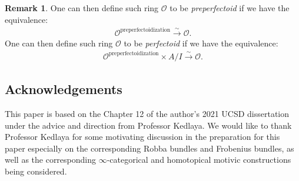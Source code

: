 \documentclass[11pt]{book}
\theoremstyle{definition}
\newtheorem{remark}[theorem]{Remark}
\numberwithin{equation}{section}
\begin{document}
\begin{remark}
One can then define such ring $\mathcal{O}$ to be \textit{preperfectoid} if we have the equivalence:
\begin{align}
\mathcal{O}^{\text{preperfectoidization}} \overset{\sim}{\longrightarrow}	\mathcal{O}.
\end{align}
One can then define such ring $\mathcal{O}$ to be \textit{perfectoid} if we have the equivalence:
\begin{align}
\mathcal{O}^{\text{preperfectoidization}}\times A/I \overset{\sim}{\longrightarrow}	\mathcal{O}.
\end{align}
	
\end{remark}













\newpage

\subsection*{Acknowledgements}

This paper is based on the Chapter 12 of the author's 2021 UCSD dissertation \cite{XT2} under the advice and direction from Professor Kedlaya. We would like to thank Professor Kedlaya for some motivating discussion in the preparation for this paper especially on the corresponding Robba bundles and Frobenius bundles, as well as the corresponding $\infty$-categorical and homotopical motivic constructions being considered.









\newpage
\end{document}
